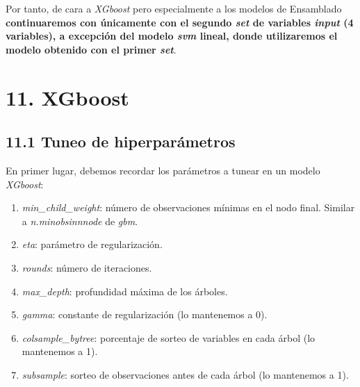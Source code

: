 \documentclass[
]{article}
\begin{document}
Por tanto, de cara a \emph{XGboost} pero especialmente a los modelos de
Ensamblado \textbf{continuaremos con únicamente con el segundo
\emph{set} de variables \emph{input} (4 variables), a excepción del
modelo \emph{svm} lineal, donde utilizaremos el modelo obtenido con el
primer \emph{set}}.

\hypertarget{xgboost}{%
\section{11. XGboost}\label{xgboost}}

\hypertarget{tuneo-de-hiperparuxe1metros}{%
\subsection{11.1 Tuneo de
hiperparámetros}\label{tuneo-de-hiperparuxe1metros}}

En primer lugar, debemos recordar los parámetros a tunear en un modelo
\emph{XGboost}:

\begin{enumerate}
\def\labelenumi{\arabic{enumi}.}
\item
  \emph{min\_child\_weight}: número de observaciones mínimas en el nodo
  final. Similar a \emph{n.minobsinnnode} de \emph{gbm}.
\item
  \emph{eta}: parámetro de regularización.
\item
  \emph{rounds}: número de iteraciones.
\item
  \emph{max\_depth}: profundidad máxima de los árboles.
\item
  \emph{gamma}: constante de regularización (lo mantenemos a 0).
\item
  \emph{colsample\_bytree}: porcentaje de sorteo de variables en cada
  árbol (lo mantenemos a 1).
\item
  \emph{subsample}: sorteo de observaciones antes de cada árbol (lo
  mantenemos a 1).
\end{enumerate}
\end{document}
